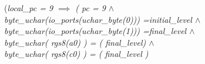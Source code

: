 \documentclass[11pt]{article} %
\begin{document}
{\begin{sloppypar}
\hspace*{0.80in}\rm (\it local\_pc \rm = \rm 9\hspace*{0.10in} $\implies$  \rm ( \it pc \rm = \rm 9 
$\land$\\
\hspace*{1.10in}\it byte\_uchar\rm (\it io\_ports\rm (\it uchar\_byte\rm (\rm 0\rm )\rm )\rm ) \rm
=\hspace*{0.10in}\it initial\_level  $\land$ \hspace*{0.20in}\\
\hspace*{1.10in}\it byte\_uchar\rm (\it io\_ports\rm (\it uchar\_byte\rm (\rm 1\rm )\rm )\rm ) \rm
=\hspace*{0.10in}\it final\_level  $\land$\\
\hspace*{1.10in}\it byte\_uchar\rm ( \it rgs8\rm (\it a0\rm ) \rm ) \rm = \rm ( \it final\_level\rm ) 
$\land$\\
\hspace*{1.10in}\it byte\_uchar\rm ( \it rgs8\rm (\it c0\rm ) \rm ) \rm = \rm ( \it final\_level \rm ) 

\end{sloppypar}}
\end{document}
